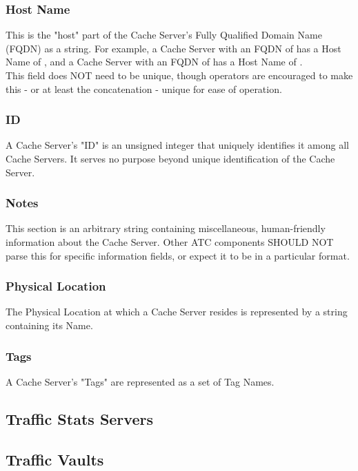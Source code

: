 \subsubsection{Host Name}
This is the "host" part of the Cache Server's Fully Qualified Domain Name (FQDN)
as a string. For example, a Cache Server with an FQDN of  has a
Host Name of , and a Cache Server with an FQDN of
 has a Host Name of .\\
This field does NOT need to be unique, though operators are encouraged to make
this - or at least the concatenation  - unique
for ease of operation.

\subsubsection{ID}
A Cache Server's "ID" is an unsigned integer that uniquely identifies it among
all Cache Servers. It serves no purpose beyond unique identification of the
Cache Server.

\subsubsection{Notes}
This section is an arbitrary string containing miscellaneous, human-friendly
information about the Cache Server. Other ATC components SHOULD NOT parse this
for specific information fields, or expect it to be in a particular format.

\subsubsection{Physical Location}
The Physical Location at which a Cache Server resides is represented by a string
containing its Name.

\subsubsection{Tags}
A Cache Server's "Tags" are represented as a set of Tag Names.


\subsection{Traffic Stats Servers}



\subsection{Traffic Vaults}



